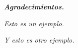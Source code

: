 \hfill{\itshape \textbf{Agradecimientos.}}
\vspace{1.2cm}

\hfill{\itshape Esto es un ejemplo.}
\vspace{1cm}

\hfill{\itshape Y esto es otro ejemplo.}
\vspace{1cm}